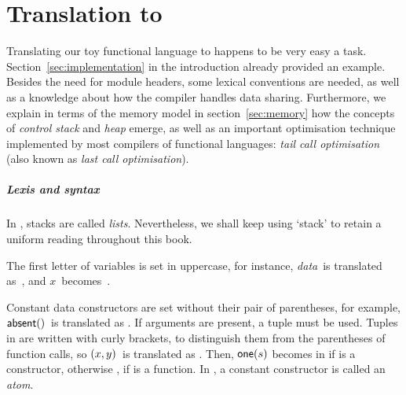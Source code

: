 \chapter{Translation to \Erlang}

Translating our toy functional language to \Erlang happens to be very
easy a task. Section~\ref{sec:implementation} in the introduction
already provided an example. Besides the need for module headers, some
lexical conventions are needed, as well as a knowledge about how the
compiler handles data sharing. Furthermore, we explain in terms of the
memory model in section~\ref{sec:memory} how the concepts of
\emph{control stack} and \emph{heap} emerge, as well as an important
optimisation technique implemented by most compilers of functional
languages: \emph{tail call optimisation} (also known as \emph{last call
  optimisation}).

\paragraph{Lexis and syntax}

In \Erlang, stacks are called \emph{lists}. Nevertheless, we shall
keep using `stack' to retain a uniform reading throughout this book.

The first letter of variables is set in uppercase, for instance,
\emph{data}~is translated as~, and
\(x\)~becomes~.

Constant data constructors
are set without their pair of parentheses, for example,
\(\textsf{absent}()\)~is translated as . If arguments are
present, a tuple must be used. Tuples in \Erlang are written with
curly brackets, to distinguish them from the parentheses of function
calls, so \(({x},{y})\)~is translated as . Then,
\(\textsf{one}(s)\) becomes  in \Erlang if 
is a constructor, otherwise , if  is a
function. In \Erlang, a constant constructor is called an
\emph{atom}.

